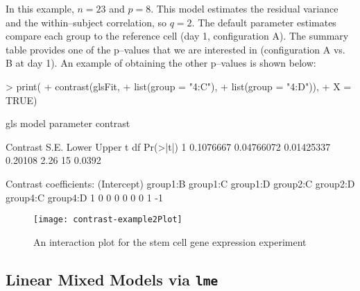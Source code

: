 \documentclass[12pt]{article}
\newcommand{\code}[1]{\mbox{\footnotesize\color{darkblue}\texttt{#1}}}
\renewenvironment{Schunk}{\vspace{\topsep}}{\vspace{\topsep}}
\begin{document}
In this example, $n=23$ and $p=8$. This model estimates the residual variance and the within--subject correlation, so $q=2$. The default parameter estimates compare each group to the reference cell (day 1, configuration A). The summary table provides one of the p--values that we are interested in (configuration A vs. B at day 1). An example of obtaining the other p--values is shown below:
\begin{Schunk}
\begin{Sinput}
> print(
+       contrast(glsFit, 
+                list(group = "4:C"),
+                list(group = "4:D")),
+       X = TRUE)     
\end{Sinput}
\begin{Soutput}
gls model parameter contrast

   Contrast       S.E.      Lower   Upper    t df Pr(>|t|)
1 0.1076667 0.04766072 0.01425337 0.20108 2.26 15   0.0392

Contrast coefficients:
  (Intercept) group1:B group1:C group1:D group2:C group2:D group4:C group4:D
1           0        0        0        0        0        0        1       -1
\end{Soutput}
\end{Schunk}


\begin{figure}[t]
   \begin{center}		
\texttt{[image: contrast-example2Plot]}
      \caption{An interaction plot for the stem cell gene expression experiment}
      \label{f:exp2}         
   \end{center}
\end{figure}
      


\subsection{Linear Mixed Models via \code{lme}}
\end{document}
